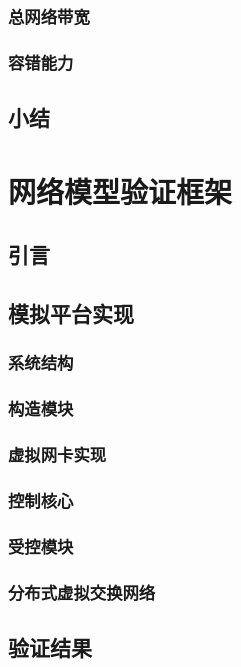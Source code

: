 \documentclass[master]{njuthesis}
\begin{document}
\subsection{总网络带宽}
\Blindtext
\subsection{容错能力}
\Blindtext
\section{小结}
\blindtext

\chapter{网络模型验证框架}\label{chapter_experiments}
\section{引言}
\Blindtext
\section{模拟平台实现}
\Blindtext
\subsection{系统结构}
\Blindtext
\subsection{构造模块}
\Blindtext
\subsection{虚拟网卡实现}
\Blindtext
\subsection{控制核心}
\Blindtext
\subsection{受控模块}
\Blindtext
\subsection{分布式虚拟交换网络}
\Blindtext
\section{验证结果}
\Blindtext
\end{document}
